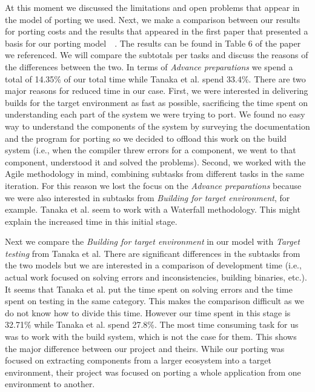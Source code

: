 At this moment we discussed the limitations and open problems that appear in the
model of porting we used. Next, we make a comparison between our results for
porting costs and the results that appeared in the first paper that presented a
basis for our porting model~\cite{b1}~. The results can be found in Table 6 of
the paper we referenced. We will compare the subtotals per tasks and discuss the
reasons of the differences between the two. In terms of \textit{Advance
preparations} we spend a total of 14.35\% of our total time while Tanaka et al.
spend 33.4\%. There are two major reasons for reduced time in our case. First,
we were interested in delivering builds for the target environment as fast as
possible, sacrificing the time spent on understanding each part of the system we
were trying to port. We found no easy way to understand the components of the
system by surveying the documentation and the program for porting so we decided
to offload this work on the build system (i.e., when the compiler threw errors
for a component, we went to that component, understood it and solved the
problems). Second, we worked with the Agile methodology in mind, combining
subtasks from different tasks in the same iteration. For this reason we
lost the focus on the \textit{Advance preparations} because we were also
interested in subtasks from \textit{Building for target environment}, for
example. Tanaka et al. seem to work with a Waterfall methodology. This might
explain the increased time in this initial stage.

Next we compare the \textit{Building for target environment} in our model with
\textit{Target testing} from Tanaka et al. There are significant differences in
the subtasks from the two models but we are interested in a comparison of
development time (i.e., actual work focused on solving errors and
inconsistencies, building binaries, etc.). It seems that Tanaka et al. put the
time spent on solving errors and the time spent on testing in the same category.
This makes the comparison difficult as we do not know how to divide this time.
However our time spent in this stage is 32.71\% while Tanaka et al. spend
27.8\%. The most time consuming task for us was to work with the build system,
which is not the case for them. This shows the major difference between our
project and theirs. While our porting was focused on extracting components from
a larger ecosystem into a target environment, their project was focused on
porting a whole application from one environment to another.

